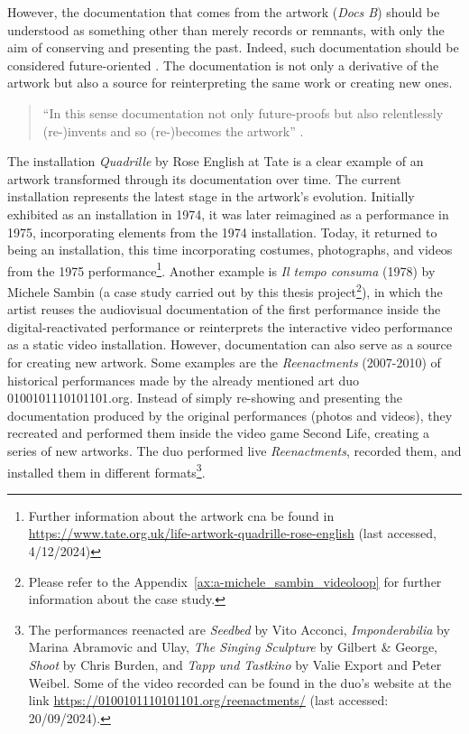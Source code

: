 However, the documentation that comes from the artwork (\textit{Docs B}) should be understood as something other than merely records or remnants, with only the aim of conserving and presenting the past. Indeed, such documentation should be considered future-oriented \cite{dekker2022documentation, giannachi2022use}. The documentation is not only a derivative of the artwork but also a source for reinterpreting the same work or creating new ones. 
\begin{quote}
“In this sense documentation not only future-proofs but also relentlessly (re-)invents and so (re-)becomes the artwork” \cite{dekker2022documentation}.     
\end{quote}
The installation \textit{Quadrille} by Rose English at Tate is a clear example of an artwork transformed through its documentation over time. The current installation represents the latest stage in the artwork’s evolution. Initially exhibited as an installation in 1974, it was later reimagined as a performance in 1975, incorporating elements from the 1974 installation. Today, it returned to being an installation, this time incorporating costumes, photographs, and videos from the 1975 performance\footnote{Further information about the artwork cna be found in \url{https://www.tate.org.uk/life-artwork-quadrille-rose-english} (last accessed, 4/12/2024)}. Another example is \textit{Il tempo consuma} (1978) by Michele Sambin (a case study carried out by this thesis project\footnote{Please refer to the Appendix~\ref{ax:a-michele_sambin_videoloop} for further information about the case study.}), in which the artist reuses the audiovisual documentation of the first performance inside the digital-reactivated performance or reinterprets the interactive video performance as a static video installation. However, documentation can also serve as a source for creating new artwork. Some examples are the \textit{Reenactments} (2007-2010) of historical performances made by the already mentioned art duo 0100101110101101.org. Instead of simply re-showing and presenting the documentation produced by the original performances (photos and videos), they recreated and performed them inside the video game Second Life, creating a series of new artworks. The duo performed live \textit{Reenactments}, recorded them, and installed them in different formats\footnote{ The performances reenacted are \textit{Seedbed} by Vito Acconci, \textit{Imponderabilia} by Marina Abramovic and Ulay, \textit{The Singing Sculpture} by Gilbert \& George, \textit{Shoot} by Chris Burden, and \textit{Tapp und Tastkino} by Valie Export and Peter Weibel. Some of the video recorded can be found in the duo’s website at the link \url{https://0100101110101101.org/reenactments/} (last accessed: 20/09/2024).}.\\
